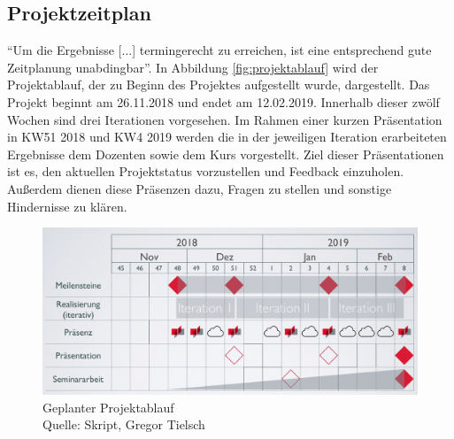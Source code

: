 	\subsection{Projektzeitplan}
	\enquote{Um die Ergebnisse [...] termingerecht zu erreichen, ist eine entsprechend gute Zeitplanung unabdingbar}\autocite[][S. 90]{projektmanagement}.
	In Abbildung \vref{fig:projektablauf} wird der Projektablauf, der zu Beginn des Projektes aufgestellt wurde, dargestellt. Das Projekt beginnt am 26.11.2018 und endet am 12.02.2019. Innerhalb dieser zwölf Wochen sind drei Iterationen vorgesehen. Im Rahmen einer kurzen Präsentation in KW51 2018 und KW4 2019 werden die in der jeweiligen Iteration erarbeiteten Ergebnisse dem Dozenten sowie dem Kurs vorgestellt. Ziel dieser Präsentationen ist es, den aktuellen Projektstatus vorzustellen und Feedback einzuholen. Außerdem dienen diese Präsenzen dazu, Fragen zu stellen und sonstige Hindernisse zu klären. 
	\begin{figure}[H]
		\centering 
		\includegraphics[width=12cm]{img/geplanterProjektablauf.png}
		\captionsetup{format=hang}
		\caption[Geplanter Projektablauf ]{\label{fig:projektablauf} Geplanter Projektablauf \\ Quelle: Skript, Gregor Tielsch }
	\end{figure}
	
